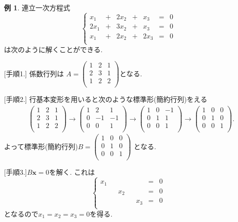 \documentclass[dvipdfmx,a4paper,11pt]{article}
\theoremstyle{definition}
\newtheorem{exa}[thm]{例}
\begin{document}
 \begin{exa}
 連立一次方程式
 $$
 \left\{ 
\begin{matrix}
x_1& + &  2x_2&  +& x_3&  = & 0 \\
2x_1& + & 3x_2&  +& x_3&  = & 0 \\
 x_1& + & 2x_2&  +& 2x_3&  = & 0 \\
\end{matrix}
\right.
 $$
 は次のように解くことができる.
 
 [手順1.] 係数行列は
$A=
\begin{pmatrix}
1 & 2&1\\
2 & 3&1\\
1 & 2&2\\
 \end{pmatrix}
 $となる.
 
 [手順2.] 行基本変形を用いると次のような標準形(簡約行列)をえる
 \begin{align*}
 &\begin{pmatrix}
1 & 2&1\\
2 & 3&1\\
1 & 2&2\\
 \end{pmatrix}
 \overset{}{\longrightarrow} 
 \begin{pmatrix}
1 & 2&1\\
0 & -1&-1\\
0 & 0&1\\
 \end{pmatrix}
 \overset{}{\longrightarrow} 
 \begin{pmatrix}
1 & 0&-1\\
0 & 1&1\\
0 & 0&1\\
 \end{pmatrix}
 \overset{}{\longrightarrow} 
  \begin{pmatrix}
1 & 0&0\\
0 & 1&0\\
0 & 0&1\\
 \end{pmatrix}.
 \end{align*}
 よって標準形(簡約行列)$B=  \begin{pmatrix}
1 & 0&0\\
0 & 1&0\\
0 & 0&1\\
 \end{pmatrix}$
 となる.
 
 [手順3.]$B\bm{x}=0$を解く. 
 これは 
 $$
 \left\{ 
\begin{matrix}
x_1&  &  &  &&  = & 0 \\
&  &x_2 &  & &  = & 0 \\
&  & &  & x_3&  = & 0 \\
\end{matrix}
\right.
 $$
 となるので$x_1 =x_2=x_3=0$を得る.
 \end{exa}
\end{document}
